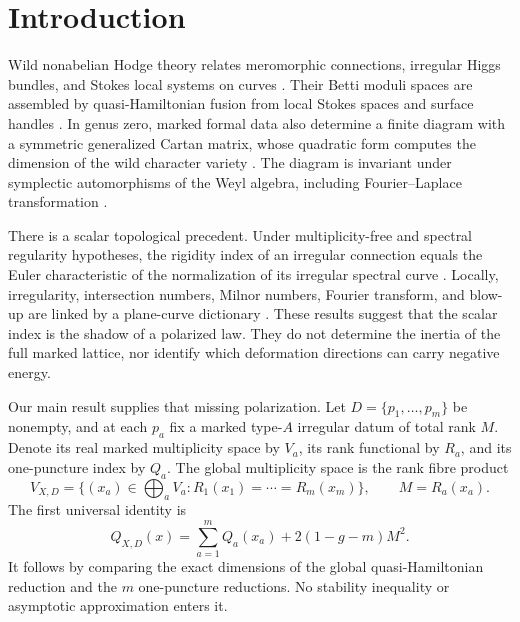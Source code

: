 \documentclass[11pt,a4paper]{amsart}
\theoremstyle{plain}
\theoremstyle{definition}
\begin{document}
\maketitle

\section{Introduction}

Wild nonabelian Hodge theory relates meromorphic connections, irregular Higgs bundles, and Stokes
local systems on curves \cite{BiquardBoalch2004}.  Their Betti moduli spaces are assembled by
quasi-Hamiltonian fusion from local Stokes spaces and surface handles
\cite{Boalch2014Geometry,BoalchYamakawa2015Twisted}.  In genus zero, marked formal data also determine a finite diagram with
a symmetric generalized Cartan matrix, whose quadratic form computes the dimension of the wild
character variety \cite{BoalchYamakawa2020,Doucot2021Diagrams}.  The diagram is invariant under
symplectic automorphisms of the Weyl algebra, including Fourier--Laplace transformation
\cite{Doucot2021Diagrams}.

There is a scalar topological precedent.  Under multiplicity-free and spectral regularity
hypotheses, the rigidity index of an irregular connection equals the Euler characteristic of the
normalization of its irregular spectral curve \cite{Hiroe2019Rigidity}.  Locally, irregularity,
intersection numbers, Milnor numbers, Fourier transform, and blow-up are linked by a plane-curve
dictionary \cite{Hiroe2017Ramified}.  These results suggest that the scalar index is the shadow of
a polarized law.  They do not determine the inertia of the full marked lattice, nor identify which
deformation directions can carry negative energy.

Our main result supplies that missing polarization.  Let $D=\{p_1,\dots,p_m\}$ be nonempty, and
at each $p_a$ fix a marked type-$A$ irregular datum of total rank $M$.  Denote its real marked
multiplicity space by $V_a$, its rank functional by $R_a$, and its one-puncture index by $Q_a$.
The global multiplicity space is the rank fibre product
\begin{equation}\label{eq:intro-fibre-product}
 V_{X,D}=\{(x_a)\in\textstyle\bigoplus_aV_a:R_1(x_1)=\cdots=R_m(x_m)\},
 \qquad M=R_a(x_a).
\end{equation}
The first universal identity is
\begin{equation}\label{eq:intro-fusion}
 \boxed{\quad Q_{X,D}(x)=\sum_{a=1}^mQ_a(x_a)+2(1-g-m)M^2.\quad}
\end{equation}
It follows by comparing the exact dimensions of the global quasi-Hamiltonian reduction and the
$m$ one-puncture reductions.  No stability inequality or asymptotic approximation enters it.
\end{document}
